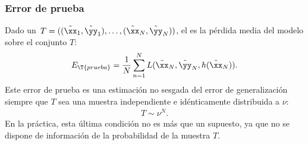 %
\subsubsection{Error de prueba}
%
Dado un 
$\,T=((\tilde{\xx}_1,\tilde{\yy}_1),\ldots,(\tilde{\xx}_N,\tilde{\yy}_N))$, el
 es la pérdida media del modelo sobre el conjunto $T$:
%
\begin{align}
  E_{\T{prueba}}=\frac{1}{N}\sum_{n=1}^N
  L(\tilde{\xx}_N,\tilde{\yy}_N,h(\tilde{\xx}_N)).
  \label{eq:error-prueba}
\end{align}
%
Este error de prueba es una estimación no sesgada del error de
generalización siempre que $T$ sea una muestra independiente e
idénticamente distribuida a $\nu$:
%
\begin{align}
  T\sim\nu^N.
  \label{eq:conj-prueba-sim-nu}
\end{align}
%
En la práctica, esta última condición no es más que un supuesto,
ya que no se dispone de información de la probabilidad
de la muestra $T$.
